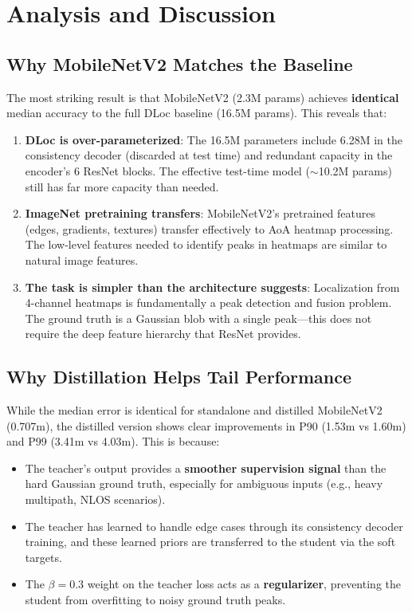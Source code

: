 \documentclass[11pt,a4paper]{article}
\begin{document}
\section{Analysis and Discussion}

\subsection{Why MobileNetV2 Matches the Baseline}

The most striking result is that MobileNetV2 (2.3M params) achieves \textbf{identical} median accuracy to the full DLoc baseline (16.5M params). This reveals that:

\begin{enumerate}[leftmargin=*]
    \item \textbf{DLoc is over-parameterized}: The 16.5M parameters include 6.28M in the consistency decoder (discarded at test time) and redundant capacity in the encoder's 6 ResNet blocks. The effective test-time model ($\sim$10.2M params) still has far more capacity than needed.

    \item \textbf{ImageNet pretraining transfers}: MobileNetV2's pretrained features (edges, gradients, textures) transfer effectively to AoA heatmap processing. The low-level features needed to identify peaks in heatmaps are similar to natural image features.

    \item \textbf{The task is simpler than the architecture suggests}: Localization from 4-channel heatmaps is fundamentally a peak detection and fusion problem. The ground truth is a Gaussian blob with a single peak---this does not require the deep feature hierarchy that ResNet provides.
\end{enumerate}

\subsection{Why Distillation Helps Tail Performance}

While the median error is identical for standalone and distilled MobileNetV2 (0.707m), the distilled version shows clear improvements in P90 (1.53m vs 1.60m) and P99 (3.41m vs 4.03m). This is because:

\begin{itemize}[leftmargin=*]
    \item The teacher's output provides a \textbf{smoother supervision signal} than the hard Gaussian ground truth, especially for ambiguous inputs (e.g., heavy multipath, NLOS scenarios).
    \item The teacher has learned to handle edge cases through its consistency decoder training, and these learned priors are transferred to the student via the soft targets.
    \item The $\beta = 0.3$ weight on the teacher loss acts as a \textbf{regularizer}, preventing the student from overfitting to noisy ground truth peaks.
\end{itemize}
\end{document}
